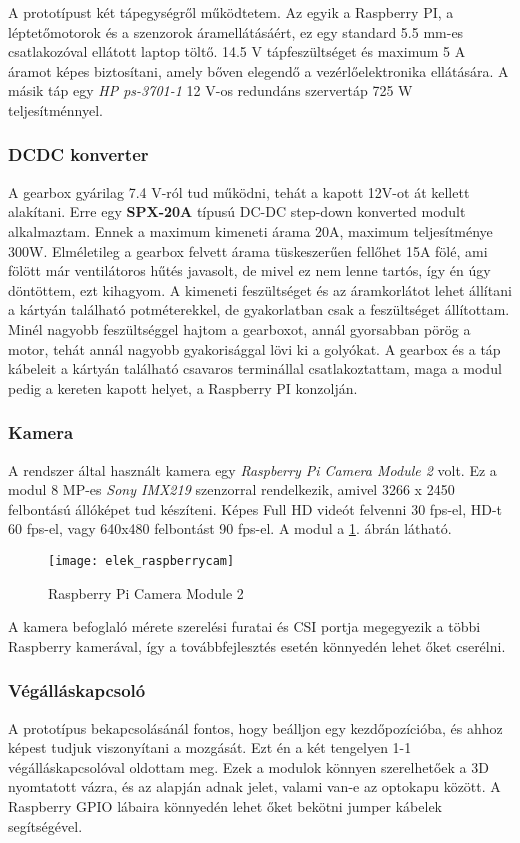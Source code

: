A prototípust két tápegységről működtetem. Az egyik a Raspberry PI, a léptetőmotorok és a szenzorok áramellátásáért, ez egy standard 5.5 mm-es csatlakozóval ellátott laptop töltő. 14.5 V tápfeszültséget és maximum 5 A áramot képes biztosítani, amely bőven elegendő a vezérlőelektronika ellátására. A másik táp egy \textsl{HP ps-3701-1} 12 V-os redundáns szervertáp 725 W teljesítménnyel. 

\subsubsection*{DCDC konverter}
A gearbox gyárilag 7.4 V-ról tud működni, tehát a kapott 12V-ot át kellett alakítani. Erre egy \textbf{SPX-20A} típusú DC-DC step-down konverted modult alkalmaztam. Ennek a maximum kimeneti árama 20A, maximum teljesítménye 300W. Elméletileg a gearbox felvett árama tüskeszerűen fellőhet 15A fölé, ami fölött már ventilátoros hűtés javasolt, de mivel ez nem lenne tartós, így én úgy döntöttem, ezt kihagyom. A kimeneti feszültséget és az áramkorlátot lehet állítani a kártyán található potméterekkel, de gyakorlatban csak a feszültséget állítottam. Minél nagyobb feszültséggel hajtom a gearboxot, annál gyorsabban pörög a motor, tehát annál nagyobb gyakorisággal lövi ki a golyókat. A gearbox és a táp kábeleit a kártyán található csavaros terminállal csatlakoztattam, maga a modul pedig a kereten kapott helyet, a Raspberry PI konzolján.

\subsubsection*{Kamera}
A rendszer által használt kamera egy \textsl{Raspberry Pi Camera Module 2} volt.\cite{raspberrycam} Ez a modul 8 MP-es \textsl{Sony IMX219} szenzorral rendelkezik, amivel 3266 x 2450 felbontású állóképet tud készíteni. Képes Full HD videót felvenni 30 fps-el, HD-t 60 fps-el, vagy 640x480 felbontást 90 fps-el. A modul a \ref{fig:elek_raspberrycam}. ábrán látható.

\begin{figure}[h!]
	\centering
	\texttt{[image: elek\_raspberrycam]}
	\caption{Raspberry Pi Camera Module 2}
	\label{fig:elek_raspberrycam}
\end{figure}

A kamera befoglaló mérete szerelési furatai és CSI portja megegyezik a többi Raspberry kamerával, így a továbbfejlesztés esetén könnyedén lehet őket cserélni.

\subsubsection*{Végálláskapcsoló}
A prototípus bekapcsolásánál fontos, hogy beálljon egy kezdőpozícióba, és ahhoz képest tudjuk viszonyítani a mozgását. Ezt én a két tengelyen 1-1 végálláskapcsolóval oldottam meg. Ezek a modulok könnyen szerelhetőek a 3D nyomtatott vázra, és az alapján adnak jelet, valami van-e az optokapu között. A Raspberry GPIO lábaira könnyedén lehet őket bekötni jumper kábelek segítségével.

